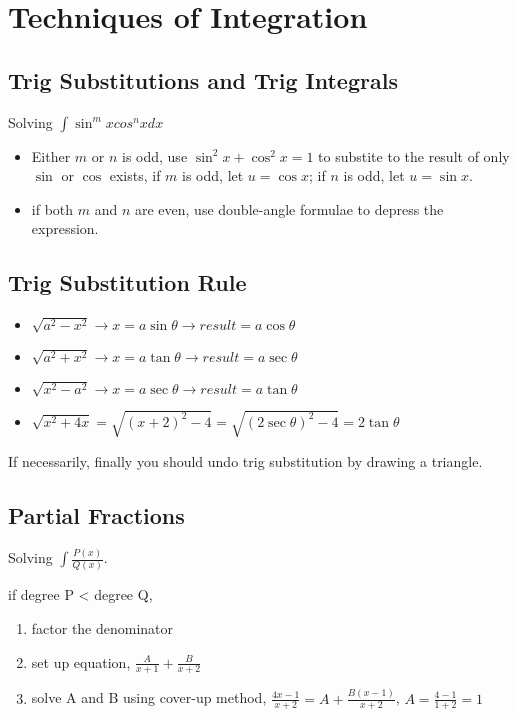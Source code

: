 \documentclass{article}
\begin{document}
\section{Techniques of Integration}
\subsection{Trig Substitutions and Trig Integrals}

Solving $\int\sin^mxcos^nxdx$

\begin{itemize}
  \item Either $m$ or $n$ is odd, use $\sin^2x + \cos^2x = 1$ to substite to the result of only $\sin$ or $\cos$ exists, if $m$ is odd, let $u = \cos x$; if $n$ is odd, let $u = \sin x$.
  \item if both $m$ and $n$ are even, use double-angle formulae to depress the expression.
\end{itemize}

\subsection{Trig Substitution Rule}
\begin{itemize}
  \item $\sqrt{a^2-x^2} \rightarrow x = a\sin \theta \rightarrow result = a\cos \theta$
  \item $\sqrt{a^2+x^2} \rightarrow x = a\tan \theta \rightarrow result = a\sec \theta$
  \item $\sqrt{x^2-a^2} \rightarrow x = a\sec \theta \rightarrow result = a\tan \theta$
  \item $\sqrt{x^2+4x} = \sqrt{(x+2)^2-4} = \sqrt{(2\sec \theta)^2-4} = 2\tan \theta$
\end{itemize}

If necessarily, finally you should undo trig substitution by drawing a triangle.

\subsection{Partial Fractions}
Solving $\int\frac{P(x)}{Q(x)}$.

if degree P < degree Q, 
\begin{enumerate}
  \item factor the denominator
  \item set up equation, $\frac{A}{x+1} + \frac{B}{x+2}$
  \item solve A and B using cover-up method, $\frac{4x-1}{x+2} = A + \frac{B(x-1)}{x+2}$, $A = \frac{4-1}{1+2} = 1$
\end{enumerate}
\end{document}
